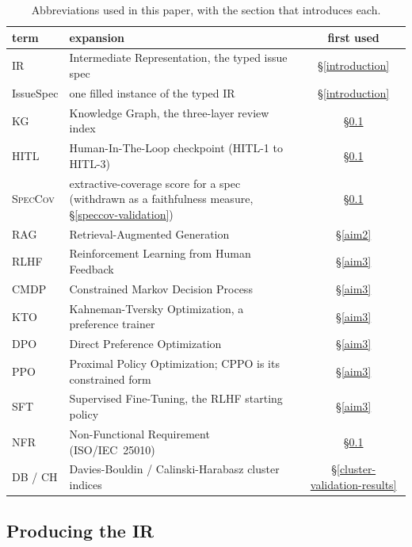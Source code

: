 \documentclass[preprint,12pt]{elsarticle}
\begin{document}
\begin{table}[!htbp]\centering\footnotesize
\caption{Abbreviations used in this paper, with the section that introduces each.}\label{tab:acronyms}
\begin{tabularx}{\textwidth}{@{}lXc@{}}\toprule
term & expansion & first used \\\midrule
IR & Intermediate Representation, the typed issue spec & \S\ref{introduction} \\
IssueSpec & one filled instance of the typed IR & \S\ref{introduction} \\
KG & Knowledge Graph, the three-layer review index & \S\ref{aim1} \\
HITL & Human-In-The-Loop checkpoint (HITL-1 to HITL-3) & \S\ref{aim1} \\
\textsc{SpecCov} & extractive-coverage score for a spec (withdrawn as a faithfulness measure, \S\ref{speccov-validation}) & \S\ref{aim1} \\
RAG & Retrieval-Augmented Generation & \S\ref{aim2} \\
RLHF & Reinforcement Learning from Human Feedback & \S\ref{aim3} \\
CMDP & Constrained Markov Decision Process & \S\ref{aim3} \\
KTO & Kahneman-Tversky Optimization, a preference trainer & \S\ref{aim3} \\
DPO & Direct Preference Optimization & \S\ref{aim3} \\
PPO & Proximal Policy Optimization; CPPO is its constrained form & \S\ref{aim3} \\
SFT & Supervised Fine-Tuning, the RLHF starting policy & \S\ref{aim3} \\
NFR & Non-Functional Requirement (ISO/IEC~25010) & \S\ref{aim1} \\
DB / CH & Davies-Bouldin / Calinski-Harabasz cluster indices & \S\ref{cluster-validation-results} \\
\bottomrule\end{tabularx}\end{table}

\subsection{Producing the IR}\label{aim1}
\end{document}
